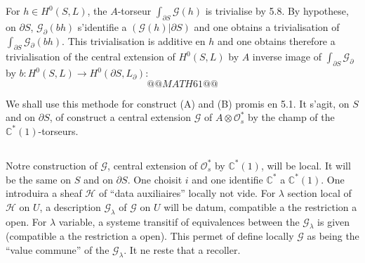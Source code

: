 \documentclass[12pt,a4paper]{article}
\theoremstyle{plain}
\theoremstyle{definition}
\theoremstyle{remark}
\newcommand{\cO}{\mathcal{O}}
\newcommand{\C}{\mathbb{C}}
\providecommand{\cO}{\mathcal{O}}
\begin{document}
For $h \in H^0(S, L)$, the $A$-torseur $\int_{\partial S} \mathscr{G}(h)$ is trivialise by 5.8. By hypothese,
on $\partial S$, $\mathscr{G}_\partial(bh)$ s'identifie a $(\mathscr{G}(h)|\partial S)$ and one obtains a trivialisation of $\int_{\partial S} \mathscr{G}_\partial(bh)$.
This trivialisation is additive en $h$ and one obtains therefore a trivialisation of the central extension of $H^0(S, L)$ by $A$ inverse image of $\int_{\partial S} \mathscr{G}_\partial$ by $b : H^0(S, L) \to H^0(\partial S, L_\partial)$:
\[
@@MATH61@@
\]

We shall use this methode for construct (A) and (B) promis en 5.1. It s'agit,
on $S$ and on $\partial S$, of construct a central extension $\mathscr{G}$ of $A \otimes \cO_s^*$ by the champ of the
$\C^*(1)$-torseurs.

\subsection{}

Notre construction of $\mathscr{G}$, central extension of $\cO_s^*$ by $\C^*(1)$, will be local.
It will be the same on $S$ and on $\partial S$. One choisit $i$ and one identifie $\C^*$ a $\C^*(1)$. One introduira
a sheaf $\mathscr{H}$ of ``data auxiliaires'' locally not vide. For $\lambda$ section local of $\mathscr{H}$
on $U$, a description $\mathscr{G}_\lambda$ of $\mathscr{G}$ on $U$ will be datum, compatible a the restriction a
open. For $\lambda$ variable, a systeme transitif of equivalences between the $\mathscr{G}_\lambda$ is given (compatible a the restriction a open). This permet of define locally $\mathscr{G}$ as being the
``value commune'' of the $\mathscr{G}_\lambda$. It ne reste that a recoller.
\end{document}
